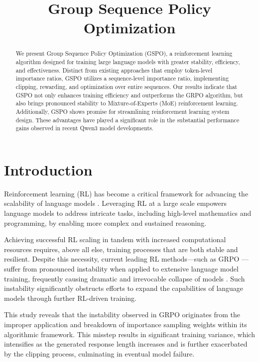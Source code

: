 \title{Group Sequence Policy Optimization}

\begin{abstract}
We present Group Sequence Policy Optimization (GSPO), a reinforcement learning algorithm designed for training large language models with greater stability, efficiency, and effectiveness. Distinct from existing approaches that employ token-level importance ratios, GSPO utilizes a sequence-level importance ratio, implementing clipping, rewarding, and optimization over entire sequences. Our results indicate that GSPO not only enhances training efficiency and outperforms the GRPO algorithm, but also brings pronounced stability to Mixture-of-Experts (MoE) reinforcement learning. Additionally, GSPO shows promise for streamlining reinforcement learning system design. These advantages have played a significant role in the substantial performance gains observed in recent Qwen3 model developments.
\end{abstract}

\section{Introduction}
\label{sec:intro}

Reinforcement learning (RL) has become a critical framework for advancing the scalability of language models \citep{o1,dpsk-r1,qwq32b,qwen3}. Leveraging RL at a large scale empowers language models to address intricate tasks, including high-level mathematics and programming, by enabling more complex and sustained reasoning.

Achieving successful RL scaling in tandem with increased computational resources requires, above all else, training processes that are both stable and resilient. Despite this necessity, current leading RL methods—such as GRPO \citep{grpo}—suffer from pronounced instability when applied to extensive language model training, frequently causing dramatic and irrevocable collapse of models \citep{qwen3, minimax-m1}. Such instability significantly obstructs efforts to expand the capabilities of language models through further RL-driven training.

This study reveals that the instability observed in GRPO originates from the improper application and breakdown of importance sampling weights within its algorithmic framework. This misstep results in significant training variance, which intensifies as the generated response length increases and is further exacerbated by the clipping process, culminating in eventual model failure.

